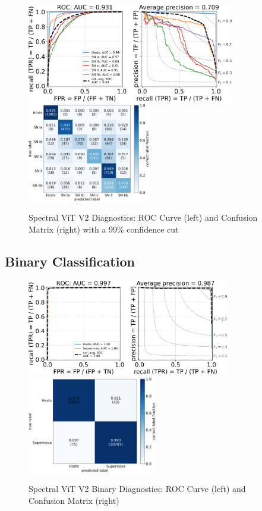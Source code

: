 \begin{figure}
    \centering
    \includegraphics[height=4.3cm]{figures/v2_real/vit_model_V2roc99_e26.png}
    \quad
    \includegraphics[height=4.3cm]{figures/v2_real/vit_model_V2cm99_e26.png}
    \caption{Spectral ViT V2 Diagnostics: ROC Curve (left) and Confusion Matrix (right) with a 99\% confidence
    cut\label{fig:v2_99_qual}}
\end{figure}



\clearpage
\subsection{Binary Classification}

\begin{figure}
    \centering
    \includegraphics[height=4.2cm]{figures/v2_real/vit_model_V2rocfull_binary_e26.png}
    \quad
    \includegraphics[height=4.2cm]{figures/v2_real/vit_model_V2cmfull_binary_e26.png}
    \caption{Spectral ViT V2 Binary Diagnostics: ROC Curve (left) and Confusion Matrix (right)\label{fig:cnn_qual}}
\end{figure}

